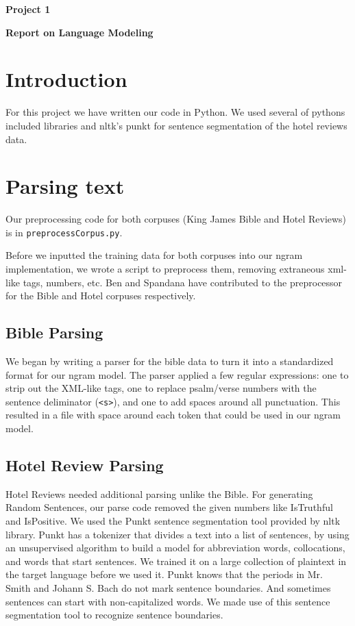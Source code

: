 \documentclass{article}
\begin{document}
\begin{center}\textbf{Project 1}\end{center}
\begin{center}\textbf{Report on Language Modeling}\end{center}

\section*{Introduction}

For this project we have written our code in Python. We used several of pythons included libraries and nltk's punkt for sentence segmentation of the hotel reviews data.

\section{Parsing text}
Our preprocessing code for both corpuses (King James Bible and Hotel Reviews) is in \texttt{preprocessCorpus.py}.\par

Before we inputted the training data for both corpuses into our ngram implementation, we wrote a script to preprocess them, removing extraneous xml-like tags, numbers, etc. Ben and Spandana have contributed to the preprocessor for the Bible and Hotel corpuses respectively.\par

\subsection{Bible Parsing}

We began by writing a parser for the bible data to turn it into a standardized format for our ngram model. The parser applied a few regular expressions: one to strip out the XML-like tags, one to replace psalm/verse numbers with the sentence deliminator (\texttt{<s>}), and one to add spaces around all punctuation. This resulted in a file with space around each token that could be used in our ngram model. 

\subsection{Hotel Review Parsing}

Hotel Reviews needed additional parsing unlike the Bible. For generating Random Sentences, our parse code removed the given numbers like IsTruthful and IsPositive. We used the Punkt sentence segmentation tool provided by nltk library. Punkt has a tokenizer that divides a text into a list of sentences, by using an unsupervised algorithm to build a model for abbreviation words, collocations, and words that start sentences. We trained it on a large collection of plaintext in the target language before we used it. Punkt knows that the periods in Mr. Smith and Johann S. Bach do not mark sentence boundaries. And sometimes sentences can start with non-capitalized words. We made use of this sentence segmentation tool to recognize sentence boundaries.
\end{document}
